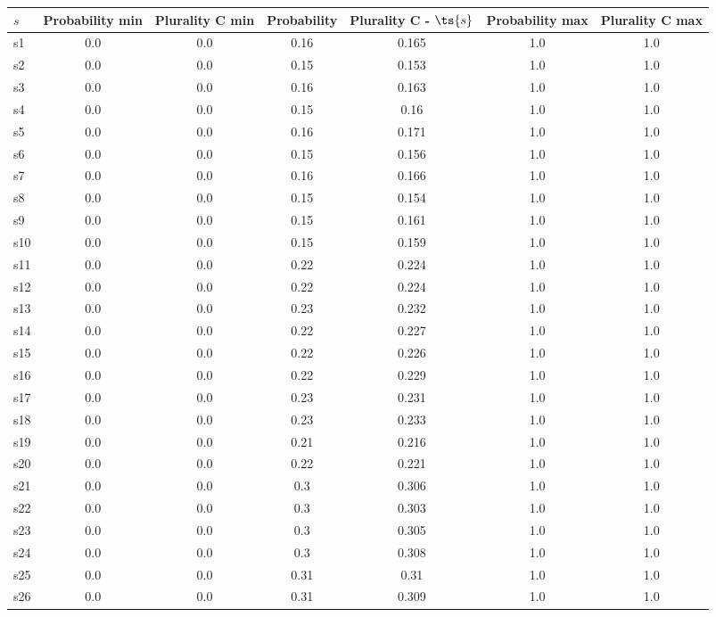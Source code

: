 \documentclass{article}
\begin{document}
\noindent\begin{tabular}{|l|c|c|c|c|c|c|}
\hline
$s$& Probability min & Plurality C min & Probability & Plurality C - $\ts{s}$ & Probability max & Plurality C max\\
\hline
s1 &0.0 & 0.0 & 0.16 & 0.165 & 1.0 & 1.0\\
\hline
s2 &0.0 & 0.0 & 0.15 & 0.153 & 1.0 & 1.0\\
\hline
s3 &0.0 & 0.0 & 0.16 & 0.163 & 1.0 & 1.0\\
\hline
s4 &0.0 & 0.0 & 0.15 & 0.16 & 1.0 & 1.0\\
\hline
s5 &0.0 & 0.0 & 0.16 & 0.171 & 1.0 & 1.0\\
\hline
s6 &0.0 & 0.0 & 0.15 & 0.156 & 1.0 & 1.0\\
\hline
s7 &0.0 & 0.0 & 0.16 & 0.166 & 1.0 & 1.0\\
\hline
s8 &0.0 & 0.0 & 0.15 & 0.154 & 1.0 & 1.0\\
\hline
s9 &0.0 & 0.0 & 0.15 & 0.161 & 1.0 & 1.0\\
\hline
s10 &0.0 & 0.0 & 0.15 & 0.159 & 1.0 & 1.0\\
\hline
s11 &0.0 & 0.0 & 0.22 & 0.224 & 1.0 & 1.0\\
\hline
s12 &0.0 & 0.0 & 0.22 & 0.224 & 1.0 & 1.0\\
\hline
s13 &0.0 & 0.0 & 0.23 & 0.232 & 1.0 & 1.0\\
\hline
s14 &0.0 & 0.0 & 0.22 & 0.227 & 1.0 & 1.0\\
\hline
s15 &0.0 & 0.0 & 0.22 & 0.226 & 1.0 & 1.0\\
\hline
s16 &0.0 & 0.0 & 0.22 & 0.229 & 1.0 & 1.0\\
\hline
s17 &0.0 & 0.0 & 0.23 & 0.231 & 1.0 & 1.0\\
\hline
s18 &0.0 & 0.0 & 0.23 & 0.233 & 1.0 & 1.0\\
\hline
s19 &0.0 & 0.0 & 0.21 & 0.216 & 1.0 & 1.0\\
\hline
s20 &0.0 & 0.0 & 0.22 & 0.221 & 1.0 & 1.0\\
\hline
s21 &0.0 & 0.0 & 0.3 & 0.306 & 1.0 & 1.0\\
\hline
s22 &0.0 & 0.0 & 0.3 & 0.303 & 1.0 & 1.0\\
\hline
s23 &0.0 & 0.0 & 0.3 & 0.305 & 1.0 & 1.0\\
\hline
s24 &0.0 & 0.0 & 0.3 & 0.308 & 1.0 & 1.0\\
\hline
s25 &0.0 & 0.0 & 0.31 & 0.31 & 1.0 & 1.0\\
\hline
s26 &0.0 & 0.0 & 0.31 & 0.309 & 1.0 & 1.0\\
\hline

\end{tabular}
\end{document}
